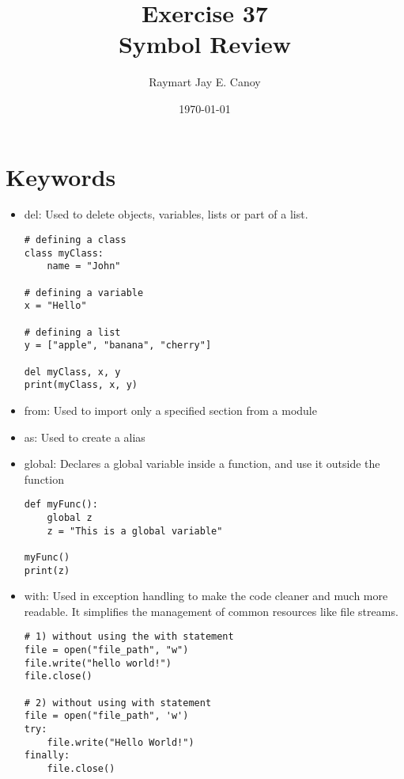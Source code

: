 \documentclass[a4paper, 12pt]{article}
\begin{document}
\title{\textbf{Exercise 37} \\ \textbf{Symbol Review}}
\author{Raymart Jay E. Canoy}
\date{\today}
\maketitle

\section{Keywords}
\begin{itemize}
\item{del: Used to delete objects, variables, lists or part of a list.}
\begin{tcolorbox}
\begin{lstlisting}
# defining a class
class myClass:
	name = "John"

# defining a variable
x = "Hello"

# defining a list
y = ["apple", "banana", "cherry"]

del myClass, x, y
print(myClass, x, y)
\end{lstlisting}
\end{tcolorbox}
\item{from: Used to import only a specified section from a module}
\item{as: Used to create a alias}
\item{global: Declares a global variable inside a function, and use it outside the function}
\begin{tcolorbox}
\begin{lstlisting}
def myFunc():
	global z
	z = "This is a global variable"
	
myFunc()
print(z)
\end{lstlisting}
\end{tcolorbox}
\item{with: Used in exception handling to make the code cleaner and much more readable. It simplifies the management of common resources like file streams.}
\pagebreak
\begin{tcolorbox}
\begin{lstlisting}
# 1) without using the with statement
file = open("file_path", "w")
file.write("hello world!")
file.close()

# 2) without using with statement
file = open("file_path", 'w')
try:
	file.write("Hello World!")
finally:
	file.close()
	

\end{lstlisting}
\end{tcolorbox}
\end{itemize}
\end{document}
